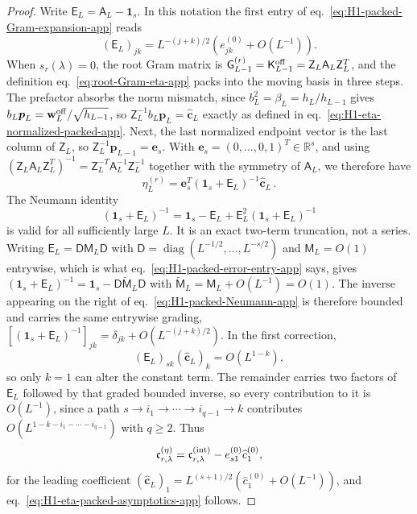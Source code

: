 \documentclass[a4paper,11pt]{article}
\theoremstyle{definition}
\theoremstyle{remark}
\newcommand{\RR}{\mathbb R}
\newcommand{\Id}{\mathbf 1}
\newcommand{\diag}{\operatorname{diag}}
\begin{document}
\begin{proof}
Write \(\mathsf E_L=\mathsf A_L-\Id_s\). In this notation the first entry of
eq.~\eqref{eq:H1-packed-Gram-expansion-app} reads
\begin{equation}
   (\mathsf E_L)_{jk}
   =
   L^{-(j+k)/2}
   \left(e_{jk}^{(0)}+O(L^{-1})\right).
   \label{eq:H1-packed-error-entry-app}
\end{equation}
When \(s_r(\lambda)=0\), the root Gram matrix is $\mathsf G_{L-1}^{(r)}=\mathsf K_{L-1}^{\rm off}
=\mathsf Z_L\mathsf A_L\mathsf Z_L^{T}$, and the definition
eq.~\eqref{eq:root-Gram-eta-app} packs into the moving basis in three steps. The prefactor absorbs
the norm mismatch, since $b_L^2=\beta_L=h_L/h_{L-1}$ gives
$b_L\boldsymbol p_L=\mathbf w_L^{\rm off}/\sqrt{h_{L-1}}$, so
$\mathsf Z_L^{-1}b_L\boldsymbol p_L=\widehat{\mathbf c}_L$ exactly as defined in
eq.~\eqref{eq:H1-eta-normalized-packed-app}. Next, the last normalized endpoint vector is the last
column of \(\mathsf Z_L\), so $\mathsf Z_L^{-1}\boldsymbol p_{L-1}=\mathbf e_s$. 
With
\(\mathbf e_s=(0,\ldots,0,1)^T\in\RR^s\), and using
$(\mathsf Z_L\mathsf A_L\mathsf Z_L^{T})^{-1}
=\mathsf Z_L^{-T}\mathsf A_L^{-1}\mathsf Z_L^{-1}$ together with the symmetry of
$\mathsf A_L$, we therefore have
\begin{equation}
   \eta_L^{(r)}
   =\mathbf e_s^T(\Id_s+\mathsf E_L)^{-1}
      \widehat{\mathbf c}_L\,.
   \label{eq:H1-off-lattice-eta-contraction-app}
\end{equation}
The Neumann identity
\begin{equation}
   (\Id_s+\mathsf E_L)^{-1}
   =\Id_s-\mathsf E_L+
   \mathsf E_L^2(\Id_s+\mathsf E_L)^{-1}
   \label{eq:H1-packed-Neumann-app}
\end{equation}
is valid for all sufficiently large \(L\). It is an exact two-term truncation, not a series.
Writing $\mathsf E_L=\mathsf D\mathsf M_L\mathsf D$ with
$\mathsf D=\diag(L^{-1/2},\ldots,L^{-s/2})$ and $\mathsf M_L=O(1)$ entrywise, which is what
eq.~\eqref{eq:H1-packed-error-entry-app} says, gives
$(\Id_s+\mathsf E_L)^{-1}=\Id_s-\mathsf D\widetilde{\mathsf M}_L\mathsf D$ with
$\widetilde{\mathsf M}_L=\mathsf M_L+O(L^{-1})=O(1)$. The inverse appearing on the right of
eq.~\eqref{eq:H1-packed-Neumann-app} is therefore bounded and carries the same entrywise grading,
$[(\Id_s+\mathsf E_L)^{-1}]_{jk}=\delta_{jk}+O(L^{-(j+k)/2})$. In the first correction,
\begin{equation}
   (\mathsf E_L)_{sk}(\widehat{\mathbf c}_L)_k
   =O(L^{1-k}),
   \label{eq:H1-first-inverse-correction-app}
\end{equation}
so only \(k=1\) can alter the constant term. The remainder carries two factors of
$\mathsf E_L$ followed by that graded bounded inverse, so every contribution to it  is \(O(L^{-1})\), since a path
\(s\to i_1\to\cdots\to i_{q-1}\to k\) contributes
\(O(L^{1-k-i_1-\cdots-i_{q-1}})\) with $q\ge2$. Thus
\begin{equation}
   \mathfrak c_{r,\lambda}^{(\eta)}
   =
   \mathfrak c_{r,\lambda}^{({\rm int})}
   -e_{s1}^{(0)}\widehat c_1^{(0)},
   \label{eq:H1-eta-constant-app}
\end{equation}
for the leading coefficient
\((\widehat{\mathbf c}_L)_1
=L^{(s+1)/2}(\widehat c_1^{(0)}+O(L^{-1}))\), and
eq.~\eqref{eq:H1-eta-packed-asymptotics-app} follows. %


\end{proof}
\end{document}
